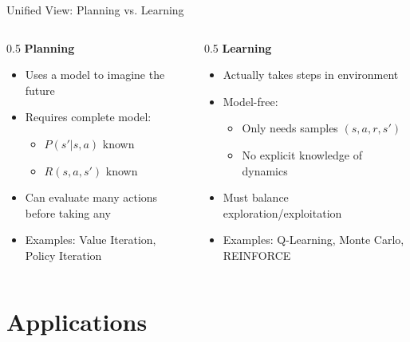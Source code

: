 \documentclass[10pt]{beamer}
\begin{document}
\begin{frame}{Unified View: Planning vs. Learning}
    \begin{columns}
        \begin{column}{0.5\textwidth}
            \textbf{Planning}
            \begin{itemize}
                \item Uses a model to imagine the future
                \item Requires complete model:
                \begin{itemize}
                    \item $P(s'|s,a)$ known
                    \item $R(s,a,s')$ known
                \end{itemize}
                \item Can evaluate many actions before taking any
                \item Examples: Value Iteration, Policy Iteration
            \end{itemize}
        \end{column}
        
        \begin{column}{0.5\textwidth}
            \textbf{Learning}
            \begin{itemize}
                \item Actually takes steps in environment
                \item Model-free:
                \begin{itemize}
                    \item Only needs samples $(s,a,r,s')$
                    \item No explicit knowledge of dynamics
                \end{itemize}
                \item Must balance exploration/exploitation
                \item Examples: Q-Learning, Monte Carlo, REINFORCE
            \end{itemize}
        \end{column}
    \end{columns}
\end{frame}


\section{Applications}
\end{document}
